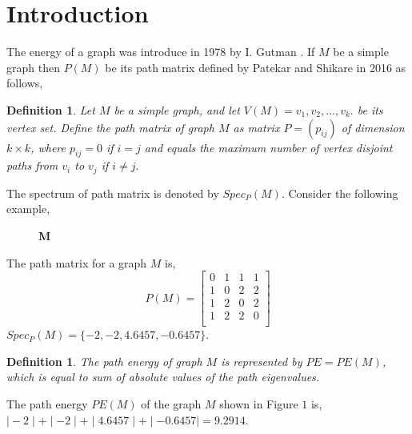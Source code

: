 \documentclass{article}
\newtheorem{definition}[theorem]{Definition}
\newtheorem*{open problem*}{Open Problem}
\begin{document}
		\section{Introduction}
	The energy of a graph was introduce in 1978 by I. Gutman \cite{ge1}. If $M$ be a simple graph then $P(M)$ be its path matrix defined by Patekar and Shikare in 2016 as follows,
	\begin{definition}\cite{pe1}
		Let $M$ be a simple graph, and let $V (M)=v_1, v_2, \ldots, v_k.$ be its vertex set. Define the path matrix of graph $M$ as matrix $P = (p_{ij})$ of dimension $k \times k$, where $p_{ij} = 0$ if $i = j$ and equals the maximum number of vertex disjoint paths from $v_i$ to $v_j$ if $i \neq j.$
	\end{definition}
	The spectrum of path matrix is denoted by $Spec_P(M)$.
	Consider the following example,
	\begin{figure}[ht]\label{example1}\centering
		\caption{\bf{M}}
	\end{figure}
	
	The path matrix for a graph $M$ is,
	\begin{equation*}
		P(M) =
		\begin{bmatrix}
			0 & 1 & 1 & 1 \\
			1 & 0 & 2 & 2 \\
			1 & 2 & 0 & 2 \\
			1 & 2 & 2 & 0 \\
		\end{bmatrix}
	\end{equation*}
	$Spec_P(M)=\{-2, -2, 4.6457, -0.6457\}.$
	\begin{definition}\cite{cn}
		The path energy of graph $M$ is represented by $PE = PE(M)$, which is equal to sum of  absolute values of the path eigenvalues. 
	\end{definition}	
	The path energy $PE(M)$ of the graph $M$ shown in Figure $1$ is, $\mid-2\mid+\mid-2\mid+\mid4.6457\mid+\mid-0.6457\mid=9.2914.$
	
\end{document}
